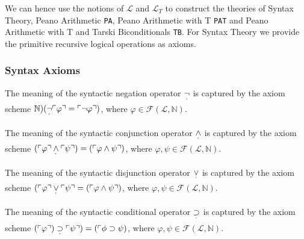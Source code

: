 We can hence use the notions of $\mathcal{L}$ and $\mathcal{L}_T$ to construct the theories of Syntax Theory, Peano Arithmetic \texttt{PA}, Peano Arithmetic with T \texttt{PAT} and Peano Arithmetic with T and Tarski Biconditionals \texttt{TB}. For Syntax Theory we provide the primitive recursive logical operations as axioms.
\subsubsection{Syntax Axioms}
\begin{definition}\label{def:Syntactic-Neg}
  \leanok
  The meaning of the syntactic negation operator $\underset{^{\boldsymbol{\cdot}}}{\neg}$ is captured by the axiom scheme $\mathbb{N})(\underset{^{\boldsymbol{\cdot}}}{\neg} \ulcorner \varphi \urcorner = \ulcorner \neg \varphi \urcorner)$, where $\varphi \in \mathcal{F}(\mathcal{L},\mathbb{N})$. 
\end{definition}

\begin{definition}\label{def:Syntactic-Conj}
  \leanok
  The meaning of the syntactic conjunction operator $\underset{^{\boldsymbol{\cdot}}}{\wedge}$ is captured by the axiom scheme $(\ulcorner \varphi \urcorner \underset{^{\boldsymbol{\cdot}}}{\wedge} \ulcorner \psi \urcorner) = (\ulcorner \varphi \wedge \psi \urcorner)$, where $\varphi, \psi \in \mathcal{F}(\mathcal{L},\mathbb{N})$.
\end{definition}

\begin{definition}\label{def:Syntactic-Disj}
  \leanok
  The meaning of the syntactic disjunction operator $\underset{^{\boldsymbol{\cdot}}}{\vee}$ is captured by the axiom scheme $(\ulcorner \varphi \urcorner \underset{^{\boldsymbol{\cdot}}}{\vee} \ulcorner \psi \urcorner = (\ulcorner \varphi \wedge \psi \urcorner)$, where $\varphi, \psi \in \mathcal{F}(\mathcal{L},\mathbb{N})$.
\end{definition}

\begin{definition}\label{def:Syntactic-Cond}
  \leanok
  The meaning of the syntactic conditional operator $\underset{^{\boldsymbol{\cdot}}}{\supset}$ is captured by the axiom scheme $(\ulcorner \varphi \urcorner) \underset{^{\boldsymbol{\cdot}}}{\supset} \ulcorner \psi \urcorner) = (\ulcorner \phi \supset \psi)$, where $\varphi, \psi \in \mathcal{F}(\mathcal{L},\mathbb{N})$.
\end{definition}

